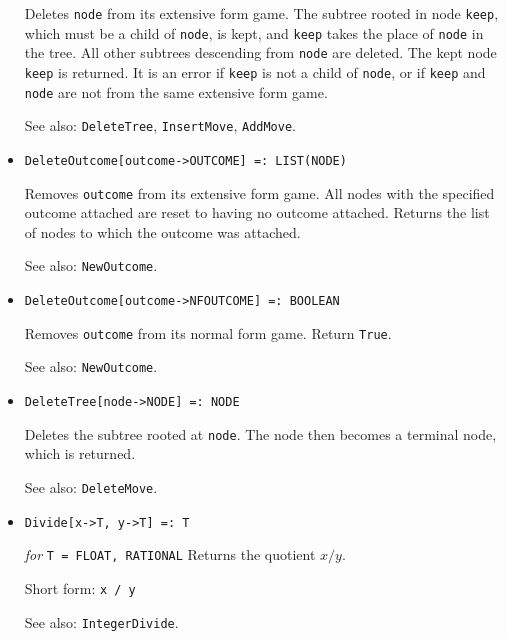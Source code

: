 \begin{itemize}
\bd
Deletes \verb+node+ from its extensive form game.  The
subtree rooted in node \verb+keep+, which must be a child of
\verb+node+, is kept, and \verb+keep+ takes the place of \verb+node+ in
the tree.  All other subtrees descending from \verb+node+ are deleted.
The kept node \verb+keep+ is returned.  It is an error if \verb+keep+
is not a child of \verb+node+, or if \verb+keep+ and \verb+node+ are not
from the same extensive form game.
\item [See also:] \verb+DeleteTree+, \verb+InsertMove+, \verb+AddMove+.
\ed

\item{}
\protect \large \begin{verbatim}
DeleteOutcome[outcome->OUTCOME] =: LIST(NODE)
\end{verbatim}\normalsize

\bd
Removes \verb+outcome+ from its extensive
form game.  All nodes with the specified outcome attached are reset to
having no outcome attached.  Returns the list of nodes to which
the outcome was attached.
\item [See also:] \verb+NewOutcome+.
\ed

\item{}
\protect \large \begin{verbatim}
DeleteOutcome[outcome->NFOUTCOME] =: BOOLEAN
\end{verbatim}\normalsize

\bd
Removes \verb+outcome+ from its normal form game.  Return \verb+True+.
\item [See also:] \verb+NewOutcome+.
\ed


\item{}
\protect \large \begin{verbatim}
DeleteTree[node->NODE] =: NODE
\end{verbatim}\normalsize

\bd
Deletes the subtree rooted at \verb+node+.  The
node then becomes a terminal node, which is returned.
\item [See also:] \verb+DeleteMove+.
\ed

\item{} 
\protect \large \begin{verbatim}
Divide[x->T, y->T] =: T
\end{verbatim} \normalsize

{\it for} {\tt T = FLOAT, RATIONAL}
\bd
Returns the quotient $x / y$. 
\item [Short form:] \verb+x / y+
\item [See also:] \verb+IntegerDivide+.
\ed


\end{itemize}
